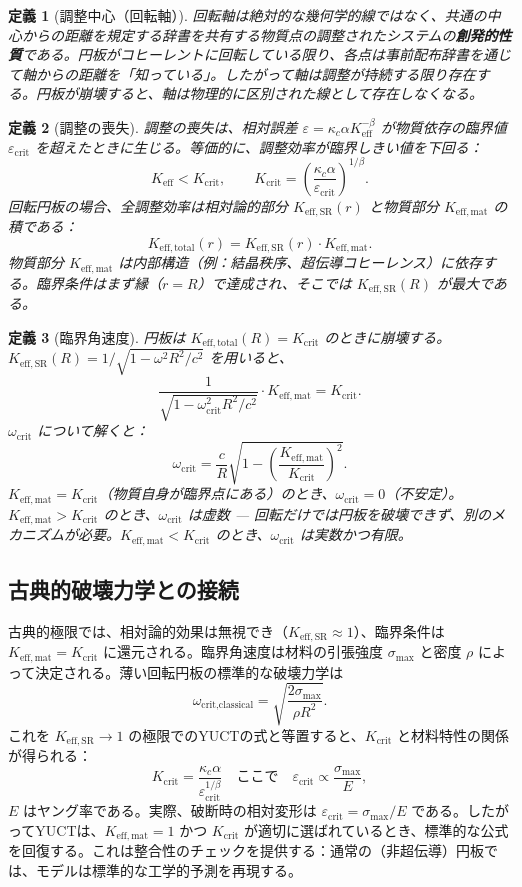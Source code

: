 \documentclass[12pt,a4paper]{article}
\newtheorem{definition}{定義}[section]
\newcommand{\kappac}{\kappa_c}
\newcommand{\betaf}{\beta}
\newcommand{\Keff}{K_{\mathrm{eff}}}
\newcommand{\Keffmat}{K_{\mathrm{eff,mat}}}
\newcommand{\Kefftot}{K_{\mathrm{eff,total}}}
\newcommand{\KeffSR}{K_{\mathrm{eff,SR}}}
\newcommand{\Kcrit}{K_{\mathrm{crit}}}
\begin{document}
	\begin{definition}[調整中心（回転軸）]
		回転軸は絶対的な幾何学的線ではなく、共通の中心からの距離を規定する辞書を共有する物質点の調整されたシステムの\textbf{創発的性質}である。円板がコヒーレントに回転している限り、各点は事前配布辞書を通じて軸からの距離を「知っている」。したがって軸は調整が持続する限り存在する。円板が崩壊すると、軸は物理的に区別された線として存在しなくなる。
	\end{definition}
	
	\begin{definition}[調整の喪失]
		調整の喪失は、相対誤差 \(\varepsilon = \kappac \alpha K_{\mathrm{eff}}^{-\betaf}\) が物質依存の臨界値 \(\varepsilon_{\text{crit}}\) を超えたときに生じる。等価的に、調整効率が臨界しきい値を下回る：
		\[
		\Keff < \Kcrit, \qquad \Kcrit = \left( \frac{\kappac \alpha}{\varepsilon_{\text{crit}}} \right)^{1/\betaf}.
		\]
		回転円板の場合、全調整効率は相対論的部分 \(K_{\mathrm{eff,SR}}(r)\) と物質部分 \(K_{\mathrm{eff,mat}}\) の積である：
		\[
		\Kefftot(r) = \KeffSR(r) \cdot \Keffmat.
		\]
		物質部分 \(K_{\mathrm{eff,mat}}\) は内部構造（例：結晶秩序、超伝導コヒーレンス）に依存する。臨界条件はまず縁（\(r = R\)）で達成され、そこでは \(\KeffSR(R)\) が最大である。
	\end{definition}
	
	\begin{definition}[臨界角速度]
		円板は \(\Kefftot(R) = \Kcrit\) のときに崩壊する。\(\KeffSR(R) = 1/\sqrt{1 - \omega^2 R^2/c^2}\) を用いると、
		\[
		\frac{1}{\sqrt{1 - \omega_{\text{crit}}^2 R^2/c^2}} \cdot \Keffmat = \Kcrit.
		\]
		\(\omega_{\text{crit}}\) について解くと：
		\[
		\boxed{\omega_{\text{crit}} = \frac{c}{R} \sqrt{1 - \left( \frac{\Keffmat}{\Kcrit} \right)^2 }}.
		\]
		\(\Keffmat = \Kcrit\)（物質自身が臨界点にある）のとき、\(\omega_{\text{crit}} = 0\)（不安定）。\(\Keffmat > \Kcrit\) のとき、\(\omega_{\text{crit}}\) は虚数 — 回転だけでは円板を破壊できず、別のメカニズムが必要。\(\Keffmat < \Kcrit\) のとき、\(\omega_{\text{crit}}\) は実数かつ有限。
	\end{definition}
	
	\subsection{古典的破壊力学との接続}
	
	古典的極限では、相対論的効果は無視でき（\(\KeffSR \approx 1\)）、臨界条件は \(\Keffmat = \Kcrit\) に還元される。臨界角速度は材料の引張強度 \(\sigma_{\text{max}}\) と密度 \(\rho\) によって決定される。薄い回転円板の標準的な破壊力学は
	\[
	\omega_{\text{crit,classical}} = \sqrt{\frac{2\sigma_{\text{max}}}{\rho R^2}}.
	\]
	これを \(\KeffSR \to 1\) の極限でのYUCTの式と等置すると、\(\Kcrit\) と材料特性の関係が得られる：
	\[
	\Kcrit = \frac{\kappac \alpha}{\varepsilon_{\text{crit}}^{1/\betaf}} \quad \text{ここで} \quad \varepsilon_{\text{crit}} \propto \frac{\sigma_{\text{max}}}{E},
	\]
	\(E\) はヤング率である。実際、破断時の相対変形は \(\varepsilon_{\text{crit}} = \sigma_{\text{max}}/E\) である。したがってYUCTは、\(\Keffmat = 1\) かつ \(\Kcrit\) が適切に選ばれているとき、標準的な公式を回復する。これは整合性のチェックを提供する：通常の（非超伝導）円板では、モデルは標準的な工学的予測を再現する。
	
\end{document}
